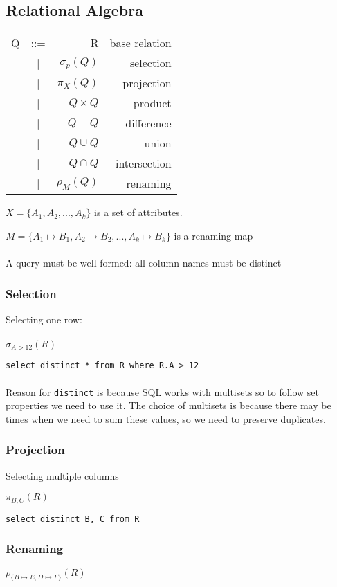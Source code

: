 \documentclass[12pt,a4paper]{article} %
\begin{document}
\subsection{Relational Algebra}
\begin{table}[H]
\begin{tabular}{lcrr}
Q & ::= & R             & base relation \\
  & |   & $\sigma_p(Q)$ & selection     \\
  & |   & $\pi_X(Q)$    & projection    \\
  & |   & $Q\times Q$   & product       \\
  & |   & $Q-Q$         & difference    \\
  & |   & $Q\cup Q$     & union         \\
  & |   & $Q\cap Q$     & intersection  \\
  & |   & $\rho_M(Q)$   & renaming     
\end{tabular}
\end{table}
$X=\{A_1, A_2, ...,A_k\}$ is a set of attributes.

$M=\{A_1\mapsto B_1,A_2\mapsto B_2,...,A_k\mapsto B_k\}$ is a renaming map
\\\\
A query must be well-formed: all column names must be distinct
\subsubsection{Selection}
Selecting one row:
\\\\
$\sigma_{A>12}(R)$

\verb|select distinct * from R where R.A > 12|
\\\\
Reason for \verb|distinct| is because SQL works with multisets so to follow set properties we need to use it. The choice of multisets is because there may be times when we need to sum these values, so we need to preserve duplicates.
\subsubsection{Projection}
Selecting multiple columns

$\pi_{B,C}(R)$

\verb|select distinct B, C from R|
\subsubsection{Renaming}
$\rho_{\{B\mapsto E,D\mapsto F\}}(R)$
\end{document}
